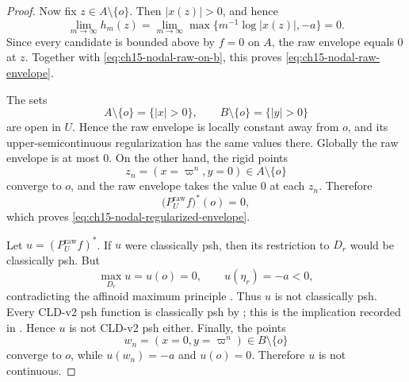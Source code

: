 \begin{proof}
Now fix \(z\in A\setminus\{o\}\).  Then \(|x(z)|>0\), and hence
\[
 \lim_{m\to\infty}h_m(z)
 =\lim_{m\to\infty}
       \max\{m^{-1}\log|x(z)|,-a\}
 =0.
\]
Since every candidate is bounded above by \(f=0\) on \(A\), the raw
envelope equals \(0\) at \(z\).  Together with
\eqref{eq:ch15-nodal-raw-on-b}, this proves
\eqref{eq:ch15-nodal-raw-envelope}.

The sets
\[
 A\setminus\{o\}=\{|x|>0\},
 \qquad
 B\setminus\{o\}=\{|y|>0\}
\]
are open in \(U\).  Hence the raw envelope is locally constant away from
\(o\), and its upper-semicontinuous regularization has the same values
there.  Globally the raw envelope is at most \(0\).  On the other hand, the
rigid points
\[
                  z_n=(x=\varpi^n,y=0)\in A\setminus\{o\}
\]
converge to \(o\), and the raw envelope takes the value \(0\) at each
\(z_n\).  Therefore
\[
                 \bigl(P_U^{\mathrm{raw}}f\bigr)^*(o)=0,
\]
which proves \eqref{eq:ch15-nodal-regularized-envelope}.

Let \(u=(P_U^{\mathrm{raw}}f)^*\).  If \(u\) were classically psh, then its
restriction to \(D_r\) would be classically psh.  But
\[
                 \max_{D_r}u=u(o)=0,
 \qquad
                 u(\eta_r)=-a<0,
\]
contradicting the affinoid maximum principle
\cite[Theorem~6.4]{GR25Classical}.  Thus \(u\) is not classically psh.
Every CLD-v2 psh function is classically psh by
; this is the implication recorded in
\cite[\S1.2]{GR25Classical}.  Hence \(u\) is not CLD-v2 psh either.
Finally, the points
\[
                  w_n=(x=0,y=\varpi^n)\in B\setminus\{o\}
\]
converge to \(o\), while \(u(w_n)=-a\) and \(u(o)=0\).  Therefore \(u\) is
not continuous.
\end{proof}
